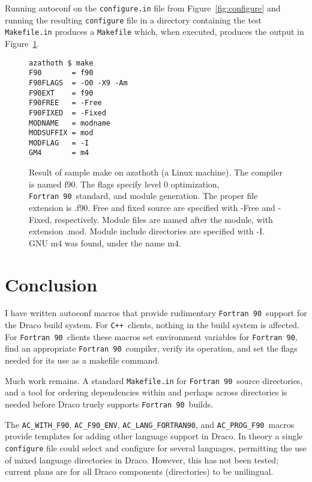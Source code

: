 \documentclass[11pt]{nmemo}
\newcommand{\fninety}{\texttt{Fortran~90}}
\newcommand{\cpp}{\texttt{C++}}
\newcommand{\fninetyenv}{\texttt{AC\_F90\_ENV}}
\newcommand{\langfninety}{\texttt{AC\_LANG\_FORTRAN90}}
\newcommand{\progfninety}{\texttt{AC\_PROG\_F90}}
\begin{document}
Running autoconf on the \texttt{configure.in} file from
Figure~\ref{fig:configure} and running the resulting
\texttt{configure} file in a directory containing the test
\texttt{Makefile.in} produces a \texttt{Makefile} which, when executed,
produces the output in Figure~\ref{fig:make}.
\begin{figure}[phbt]
\hrulefill
\begin{verbatim}
azathoth $ make
F90       = f90
F90FLAGS  = -O0 -X9 -Am
F90EXT    = f90
F90FREE   = -Free
F90FIXED  = -Fixed
MODNAME   = modname
MODSUFFIX = mod
MODFLAG   = -I
GM4       = m4
\end{verbatim}%
\caption{Result of sample make on azathoth (a Linux
machine).  The compiler is named f90.  The flags specify level 0
optimization, \fninety\ standard, and module generation.  The proper
file extension is .f90.  Free and fixed source are specified with
-Free and -Fixed, respectively.  Module files are named after the
module, with extension .mod.  Module include directories are specified
with -I.  GNU m4 was found, under the name m4.}\label{fig:make}
\hrulefill
\end{figure}

\section{Conclusion}

I have written autoconf macros that provide rudimentary \fninety\
support for the Draco build system.  For \cpp\ clients, nothing in the
build system is affected.  For \fninety\ clients these macros set
environment variables for \fninety, find an appropriate \fninety\
compiler, verify its operation, and set the flags needed for its use
as a makefile command.

Much work remains.  A standard \texttt{Makefile.in}
for \fninety\ source directories, and a tool for ordering dependencies
within and perhaps across directories is needed before Draco truely
supports \fninety\ builds.  

The \texttt{AC\_WITH\_F90}, \fninetyenv, \langfninety, and
\progfninety\ macros provide templates for adding other language
support in Draco.  In theory a single \texttt{configure} file could
select and configure for several languages, permitting the use of
mixed language directories in Draco.  However, this has not been
tested; current plans are for all Draco components (directories) to be
unilingual.
 
\end{document}
